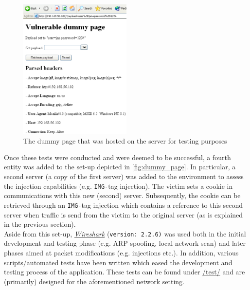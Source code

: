 \begin{figure}[h!]
	\centering
	\includegraphics[width=0.5\textwidth]{img/dummy_page.png}
	\caption{
		The dummy page that was hosted on the server for testing purposes}
	\label{fig:dummy_page}
\end{figure}

Once these tests were conducted and were deemed to be successful, a fourth entity was added to the set-up depicted in \autoref{fig:dummy_page}. In particular, a second server (a copy of the first server) was added to the environment to assess the injection capabilities (e.g. \texttt{IMG-}tag injection). The victim sets a cookie in communications with this new (second) server. Subsequently, the cookie can be retrieved through an \texttt{IMG-}tag injection which contains a reference to this second server when traffic is send from the victim to the original server (as is explained in the previous section). \\

Aside from this set-up, \href{https://www.wireshark.org/}{\textit{Wireshark}} (\texttt{version: 2.2.6)} was used both in the initial development and testing phase (e.g. ARP-spoofing, local-network scan) and later phases aimed at packet modifications (e.g. injections etc.). In addition, various scripts/automated tests have been written which eased the development and testing process of the application. These tests can be found under \href{https://github.com/akbokha/fhttp/tree/master/test}{ /test/} and are (primarily) designed for the aforementioned network setting.\\

